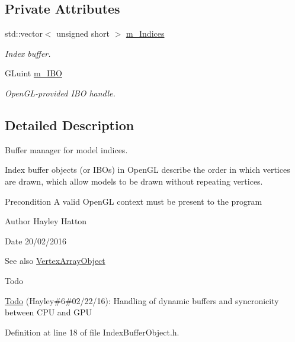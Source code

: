 \subsection*{Private Attributes}
\begin{DoxyCompactItemize}
\item 
std\+::vector$<$ unsigned short $>$ \hyperlink{class_index_buffer_object_a990bafed8ff20200858ce93a833019af}{m\+\_\+\+Indices}
\begin{DoxyCompactList}\small\item\em Index buffer. \end{DoxyCompactList}\item 
G\+Luint \hyperlink{class_index_buffer_object_a861d3d51556c2e639d626a74d9ff71c6}{m\+\_\+\+I\+BO}
\begin{DoxyCompactList}\small\item\em Open\+G\+L-\/provided I\+BO handle. \end{DoxyCompactList}\end{DoxyCompactItemize}


\subsection{Detailed Description}
Buffer manager for model indices. 

Index buffer objects (or I\+B\+Os) in Open\+GL describe the order in which vertices are drawn, which allow models to be drawn without repeating vertices.

\begin{DoxyPrecond}{Precondition}
A valid Open\+GL context must be present to the program 
\end{DoxyPrecond}
\begin{DoxyAuthor}{Author}
Hayley Hatton 
\end{DoxyAuthor}
\begin{DoxyDate}{Date}
20/02/2016 
\end{DoxyDate}
\begin{DoxySeeAlso}{See also}
\hyperlink{class_vertex_array_object}{Vertex\+Array\+Object} 
\end{DoxySeeAlso}
\begin{DoxyRefDesc}{Todo}
\item[\hyperlink{todo__todo000006}{Todo}](Hayley\#6\#02/22/16)\+: Handling of dynamic buffers and syncronicity between C\+PU and G\+PU \end{DoxyRefDesc}


Definition at line 18 of file Index\+Buffer\+Object.\+h.



